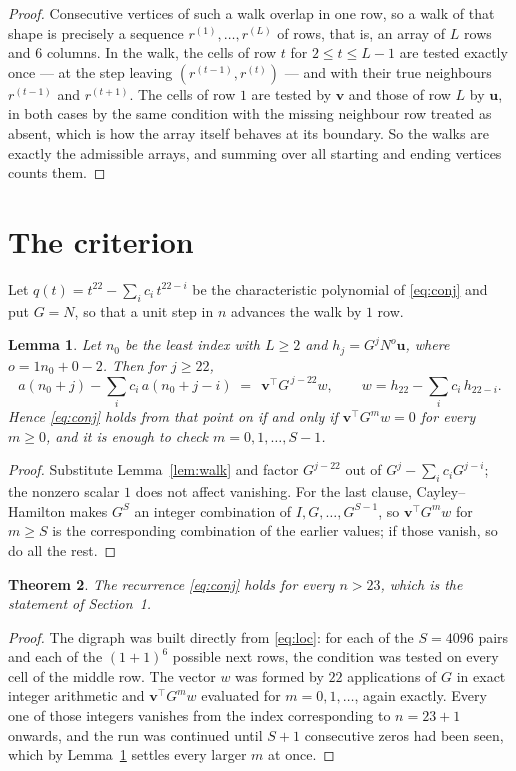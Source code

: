 \documentclass[11pt,a4paper]{article}
\theoremstyle{plain}
\newtheorem{theorem}{Theorem}
\newtheorem{lemma}[theorem]{Lemma}
\theoremstyle{definition}
\begin{document}
\begin{proof}
Consecutive vertices of such a walk overlap in one row, so a walk of that shape is
precisely a sequence $r^{(1)},\dots,r^{(L)}$ of rows, that is, an array of $L$ rows
and $6$ columns. In the walk, the cells of row $t$ for $2\le t\le L-1$ are tested
exactly once --- at the step leaving $(r^{(t-1)},r^{(t)})$ --- and with their true
neighbours $r^{(t-1)}$ and $r^{(t+1)}$. The cells of row $1$ are tested by
$\mathbf{v}$ and those of row $L$ by $\mathbf{u}$, in both cases by the same condition
with the missing neighbour row treated as absent, which is how the array itself behaves at
its boundary. So the walks are exactly the admissible arrays, and summing over all starting
and ending vertices counts them.
\end{proof}

\section{The criterion}

Let $q(t)=t^{22}-\sum_i c_i\,t^{22-i}$ be the characteristic polynomial of
\eqref{eq:conj} and put $G=N$, so that a unit step in $n$ advances the walk by
$1$ row.

\begin{lemma}\label{lem:crit}
Let $n_0$ be the least index with $L\ge2$ and $h_j=G^{j}N^{o}\mathbf{u}$, where
$o=1n_0+0-2$. Then for $j\ge22$,
\[
a(n_0+j)-\sum_i c_i\,a(n_0+j-i)\;=\;\,\mathbf{v}^{\!\top}G^{\,j-22}w,
\qquad w=h_{22}-\sum_i c_i\,h_{22-i} .
\]
Hence \eqref{eq:conj} holds from that point on if and only if
$\mathbf{v}^{\!\top}G^{m}w=0$ for every $m\ge0$, and it is enough to check
$m=0,1,\dots,S-1$.
\end{lemma}

\begin{proof}
Substitute Lemma~\ref{lem:walk} and factor $G^{j-22}$ out of
$G^{j}-\sum_ic_iG^{j-i}$; the nonzero scalar $1$ does not affect
vanishing. For the last clause, Cayley--Hamilton makes $G^{S}$ an integer combination of
$I,G,\dots,G^{S-1}$, so $\mathbf{v}^{\!\top}G^{m}w$ for $m\ge S$ is the corresponding
combination of the earlier values; if those vanish, so do all the rest.
\end{proof}

\begin{theorem}
The recurrence \eqref{eq:conj} holds for every $n>23$, which is the statement of
Section~1.
\end{theorem}

\begin{proof}
The digraph was built directly from \eqref{eq:loc}: for each of the $S=4096$ pairs and each
of the $(1+1)^{6}$ possible next rows, the condition was tested on every cell of
the middle row. The vector $w$ was formed by $22$ applications of $G$ in exact integer
arithmetic and $\mathbf{v}^{\!\top}G^{m}w$ evaluated for $m=0,1,\dots$, again exactly.
Every one of those integers vanishes from the index corresponding to $n=23+1$ onwards,
and the run was continued until $S+1$ consecutive zeros had been seen, which by
Lemma~\ref{lem:crit} settles every larger $m$ at once.
\end{proof}
\end{document}
